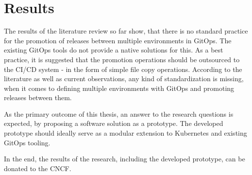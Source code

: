 \chapter{Results}

The results of the literature review so far show,
that there is no standard practice for the promotion of releases between multiple environments in GitOps.
The existing GitOps tools do not provide
a native solutions for this.
As a best practice, it is suggested that the promotion operations
should be outsourced to the CI/CD system
- in the form of simple file copy operations.
According to the literature as well as current observations,
any kind of standardization is missing,
when it comes to defining multiple environments with GitOps
and promoting releases between them.
\bigskip

\noindent
As the primary outcome of this thesis,
an answer to the research questions is expected,
by proposing a software solution as a prototype.
The developed prototype should ideally serve as a 
modular extension to Kubernetes and existing GitOps tooling.
\bigskip

%

\noindent
In the end, the results of the research,
including the developed prototype,
can be donated to the CNCF.

